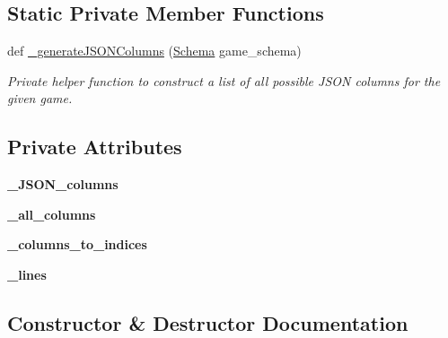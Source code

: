 \subsection*{Static Private Member Functions}
\begin{DoxyCompactItemize}
\item 
def \mbox{\hyperlink{class_raw_manager_1_1_raw_manager_a694c88c0fa93d6a7de9eac1c4fc6ec41}{\+\_\+generate\+J\+S\+O\+N\+Columns}} (\mbox{\hyperlink{classschemas_1_1_schema_1_1_schema}{Schema}} game\+\_\+schema)
\begin{DoxyCompactList}\small\item\em Private helper function to construct a list of all possible J\+S\+ON columns for the given game. \end{DoxyCompactList}\end{DoxyCompactItemize}
\subsection*{Private Attributes}
\begin{DoxyCompactItemize}
\item 
\mbox{\label{class_raw_manager_1_1_raw_manager_a5b4e7f8e3bafacbc3f13acebd27d8406}} 
{\bfseries \+\_\+\+J\+S\+O\+N\+\_\+columns}
\item 
\mbox{\label{class_raw_manager_1_1_raw_manager_aa4bbc716d06ce743642e64109d39e147}} 
{\bfseries \+\_\+all\+\_\+columns}
\item 
\mbox{\label{class_raw_manager_1_1_raw_manager_a0e56eb61692028e319691b35ed295833}} 
{\bfseries \+\_\+columns\+\_\+to\+\_\+indices}
\item 
\mbox{\label{class_raw_manager_1_1_raw_manager_a109af60a7672888cb33fecb47a919cfa}} 
{\bfseries \+\_\+lines}
\end{DoxyCompactItemize}


\subsection{Constructor \& Destructor Documentation}
\mbox{\label{class_raw_manager_1_1_raw_manager_a44e637891a42f1bf6aab68a21a10aefe}} 
